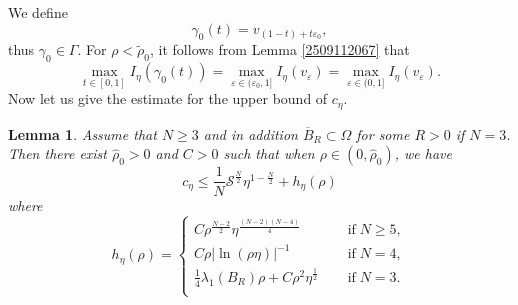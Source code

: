 \documentclass[10pt]{article}
\numberwithin{equation}{section}
\newtheorem{lemma}[theorem]{Lemma}
\numberwithin{equation}{section}
\begin{document}
We define
\[
\gamma_{0}(t)=v_{(1-t)+t{\varepsilon_0}},
\]
thus $\gamma_0\in\Gamma$. For $\rho<\widetilde{\rho}_0$,  it follows from Lemma \ref{2509112067} that 
\begin{equation}\label{2509112056}
\underset{t\in [0, 1]}{\max}I_\eta(\gamma_0(t))=\underset{\varepsilon\in (\varepsilon_0, 1]}{\max}I_\eta(v_\varepsilon)=\underset{\varepsilon\in (0, 1]}{\max}I_\eta(v_\varepsilon).
\end{equation}
 Now let us give the estimate for the upper bound of $c_\eta$.
\begin{lemma}\label{2509121247}
Assume that $N\ge 3$ and in addition $\overline{B}_R\subset\Omega$ for some $R>0$ if $N=3$. Then there exist $\widehat{\rho}_0>0$ and $C>0$ such that when $\rho\in (0,\widehat{\rho}_0)$, we have
\begin{equation} \label{2509121246}
c_\eta\le \frac{1}{N}{\mathcal{S}}^{\frac{N}{2}}\eta^{1-\frac{N}{2}}+h_\eta(\rho)
\end{equation}
where
\[
h_\eta(\rho)=
\begin{cases}
C\rho^{\frac{N-2}{2}}\eta^{\frac{(N-2)(N-4)}{4}}\quad\; &\mbox{if}\; N\ge 5,\\
C\rho|\ln{(\rho\eta)}|^{-1}\quad\; &\mbox{if}\; N= 4,\\
\frac{1}{4}\lambda_1(B_R)\rho+C\rho^{2}\eta^{\frac12}\quad\; &\mbox{if}\; N=3.\\
\end{cases}
\]
\end{lemma}
\end{document}
